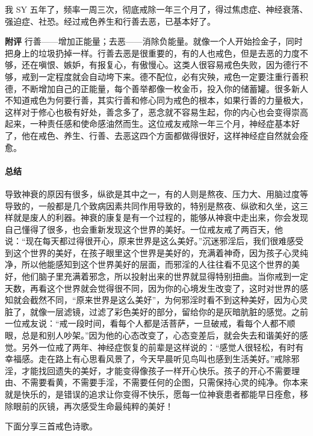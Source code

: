 \begin{case}[神经衰弱]
    我 SY 五年了，频率一周三次，彻底戒除一年三个月了，得过焦虑症、神经衰落、强迫症、社恐。经过戒色养生和行善去恶，已基本好了。

    \textbf{附评} 行善——增加正能量；去恶——消除负能量。就像一个人开始捡金子，同时把身上的垃圾扔掉一样。行善去恶是很重要的，有的人也戒色，但是去恶的力度不够，还在嗔恨、嫉妒，有报复心，有傲慢心。这类人很容易戒色失败，因为德行不够，戒到一定程度就会自动垮下来。德不配位，必有灾殃，戒色一定要注重行善积德，不断增加自己的正能量，每个善举都像一枚金币，投入你的储蓄罐。很多新人不知道戒色为何要行善，其实行善和修心同为戒色的根本，如果行善的力量极大，这样对于修心也极有好处，善念多了，恶念就不容易生起，你的内心也会变得崇高起来，一种责任感和使命感油然而生。这位戒友戒除一年三个月，神经症基本好了，他在戒色、养生、行善、去恶这四个方面都做得很好，这样神经症自然就会痊愈。
\end{case}

\paragraph*{总结}

导致神衰的原因有很多，纵欲是其中之一，有的人则是熬夜、压力大、用脑过度等导致的，一般都是几个致病因素共同作用导致的，特别是熬夜、纵欲和久坐，这三样就是废人的利器。神衰的康复是有一个过程的，能够从神衰中走出来，你会发现自己懂得了很多，也会重新发现这个世界的美好。一位戒友戒了两百天，他说：“现在每天都过得很开心，原来世界是这么美好。”沉迷邪淫后，我们很难感受到这个世界的美好，在孩子眼里这个世界是美好的，充满着神奇，因为孩子心灵纯净，所以他能感知到这个世界美好的层面，而邪淫的人往往看不见这个世界的美好，他们脑子里充满着邪念，所以投射出来的世界就显得特别扭曲。当你戒到一定天数，再看这个世界就会觉得很不同，因为你的心境发生改变了，这时对世界的感知就会截然不同，“原来世界是这么美好”，为何邪淫时看不到这种美好，因为心灵脏了，就像一层滤镜，过滤了彩色美好的部分，留给你的是灰暗肮脏的感觉。之前一位戒友说：“戒一段时间，看每个人都是活菩萨，一旦破戒，看每个人都不顺眼，总是和别人吵架。”因为他的心态改变了，心态变差后，就会失去和谐美好的感觉。另外一位戒了两年、神经症恢复的前辈是这样说的：“感觉人很轻松，有时有幸福感。走在路上有心思看风景了，今天早晨听见鸟叫也感到生活美好。”戒除邪淫，才能找回遗失的美好，才能变得像孩子一样开心快乐。孩子的开心不需要理由、不需要看黄，不需要手淫，不需要任何的企图，只需保持心灵的纯净。你本来就是快乐的，是错误的追求让你变得不快乐，愿每一位神衰患者都能早日痊愈，移除眼前的灰镜，再次感受生命最纯粹的美好！

下面分享三首戒色诗歌。


